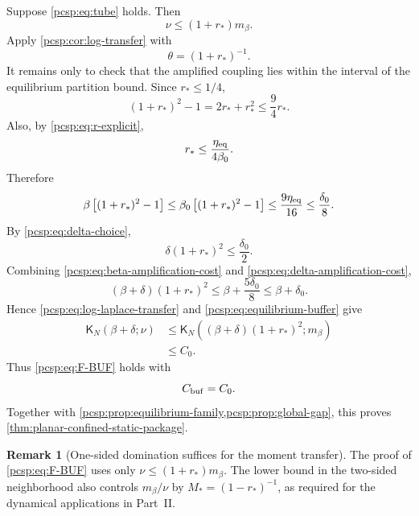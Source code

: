 \documentclass[11pt,reqno]{amsart}
\numberwithin{equation}{section}
\theoremstyle{plain}
\theoremstyle{definition}
\newtheorem{remark}[remark]{Remark}
\newcommand{\be}{\beta}
\newcommand{\K}{\mathsf K}
\begin{document}
Suppose \eqref{pcsp:eq:tube} holds.  Then
\begin{equation}\label{pcsp:eq:upper-domination-tube}
 \nu\leq(1+r_*)m_\be.
\end{equation}
Apply \cref{pcsp:cor:log-transfer} with
\begin{equation}\label{pcsp:eq:theta-choice}
 \theta=(1+r_*)^{-1}.
\end{equation}
It remains only to check that the amplified coupling lies within the interval of the equilibrium partition bound.  Since $r_*\leq1/4$,
\begin{equation}\label{pcsp:eq:amplification-elementary}
 (1+r_*)^2-1=2r_*+r_*^2\leq\frac94r_*.
\end{equation}
Also, by \eqref{pcsp:eq:r-explicit},
\begin{equation}\label{pcsp:eq:r-upper-eta}
 r_*\leq\frac{\eta_{\rm eq}}{4\be_0}.
\end{equation}
Therefore
\begin{equation}\label{pcsp:eq:beta-amplification-cost}
 \be\left[(1+r_*)^2-1\right]
 \leq\be_0\left[(1+r_*)^2-1\right]
 \leq\frac{9\eta_{\rm eq}}{16}
 \leq\frac{\delta_0}{8}.
\end{equation}
By \eqref{pcsp:eq:delta-choice},
\begin{equation}\label{pcsp:eq:delta-amplification-cost}
 \delta(1+r_*)^2\leq\frac{\delta_0}{2}.
\end{equation}
Combining \eqref{pcsp:eq:beta-amplification-cost} and \eqref{pcsp:eq:delta-amplification-cost},
\begin{equation}\label{pcsp:eq:amplified-coupling}
 (\be+\delta)(1+r_*)^2
 \leq\be+\frac{5\delta_0}{8}
 \leq\be+\delta_0.
\end{equation}
Hence \eqref{pcsp:eq:log-laplace-transfer} and \eqref{pcsp:eq:equilibrium-buffer} give
\begin{align}
 \K_N(\be+\delta;\nu)
 &\leq\K_N((\be+\delta)(1+r_*)^2;m_\be)
 \label{pcsp:eq:transfer-application}\\
 &\leq C_0.
 \label{pcsp:eq:transfer-application-final}
\end{align}
Thus \eqref{pcsp:eq:F-BUF} holds with
\begin{equation}\label{pcsp:eq:Cbuf-choice}
 C_{\rm buf}=C_0.
\end{equation}
Together with \cref{pcsp:prop:equilibrium-family,pcsp:prop:global-gap}, this proves \cref{thm:planar-confined-static-package}.

\begin{remark}[One-sided domination suffices for the moment transfer]\label{pcsp:rem:one-sided}
The proof of \eqref{pcsp:eq:F-BUF} uses only $\nu\leq(1+r_*)m_\be$.  The lower bound in the two-sided neighborhood also controls $m_\be/\nu$ by $M_*=(1-r_*)^{-1}$, as required for the dynamical applications in Part~II.
\end{remark}
\end{document}
